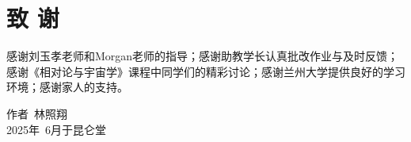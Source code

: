 \section*{致 \quad \quad 谢}\parskip=-1mm

感谢刘玉孝老师和Morgan老师的指导；感谢助教学长认真批改作业与及时反馈；感谢《相对论与宇宙学》课程中同学们的精彩讨论；感谢兰州大学提供良好的学习环境；感谢家人的支持。

\hfill\phantom{} \hfill  作者~林照翔~\\
\hfill\phantom{}\hfill 2025年~6月于昆仑堂